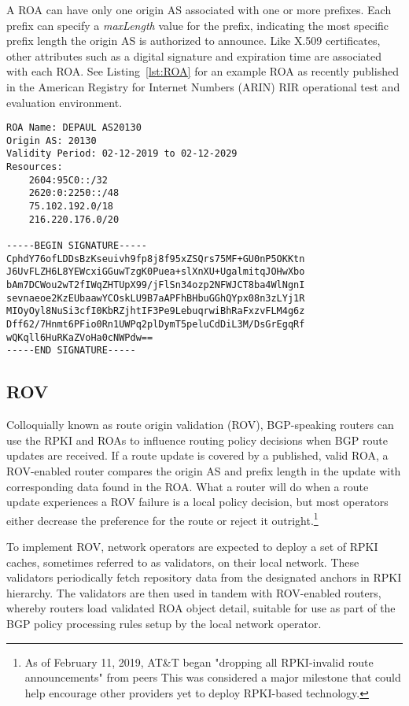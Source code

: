 \documentclass[sigconf]{acmart}
\begin{document}
A ROA can have only one origin AS associated with one or more prefixes.
Each prefix can specify a \emph{maxLength} value for the prefix,
indicating the most specific prefix length the origin AS is authorized
to announce.  Like X.509 certificates, other attributes such as a
digital signature and expiration time are associated with each ROA.  See
Listing~\ref{lst:ROA} for an example ROA as recently published in the
American Registry for Internet Numbers (ARIN) RIR operational test and
evaluation environment.

\begin{lstlisting}[float,basicstyle=\footnotesize\ttfamily,caption={Example AS 20130 ROA},label={lst:ROA}]
ROA Name: DEPAUL AS20130
Origin AS: 20130
Validity Period: 02-12-2019 to 02-12-2029
Resources:
    2604:95C0::/32
    2620:0:2250::/48
    75.102.192.0/18
    216.220.176.0/20

-----BEGIN SIGNATURE-----
CphdY76ofLDDsBzKseuivh9fp8j8f95xZSQrs75MF+GU0nP5OKKtn
J6UvFLZH6L8YEWcxiGGuwTzgK0Puea+slXnXU+UgalmitqJOHwXbo
bAm7DCWou2wT2fIWqZHTUpX99/jFlSn34ozp2NFWJCT8ba4WlNgnI
sevnaeoe2KzEUbaawYCOskLU9B7aAPFhBHbuGGhQYpx08n3zLYj1R
MIOyOyl8NuSi3cfI0KbRZjhtIF3Pe9LebuqrwiBhRaFxzvFLM4g6z
Dff62/7Hnmt6PFio0Rn1UWPq2plDymT5peluCdDiL3M/DsGrEgqRf
wQKqll6HuRKaZVoHa0cNWPdw==
-----END SIGNATURE-----
\end{lstlisting}

\subsection{ROV}

Colloquially known as route origin validation (ROV), BGP-speaking
routers can use the RPKI and ROAs to influence routing policy decisions
when BGP route updates are received.\cite{bush_origin_2014}  If a route
update is covered by a published, valid ROA, a ROV-enabled router
compares the origin AS and prefix length in the update with
corresponding data found in the ROA.  What a router will do when a route
update experiences a ROV failure is a local policy decision, but most
operators either decrease the preference for the route or reject it
outright.\footnote{As of February 11, 2019, AT\&T began "dropping all
RPKI-invalid route announcements" from
peers\cite{borkenhagen_at&t/as7018_2019}  This was considered a major
milestone that could help encourage other providers yet to deploy
RPKI-based technology.}

To implement ROV, network operators are expected to deploy a set of RPKI
caches, sometimes referred to as validators, on their local network.
These validators periodically fetch repository data from the designated
anchors in RPKI hierarchy.  The validators are then used in tandem with
ROV-enabled routers, whereby routers load validated ROA object detail,
suitable for use as part of the BGP policy processing rules setup by the
local network operator.
\end{document}
